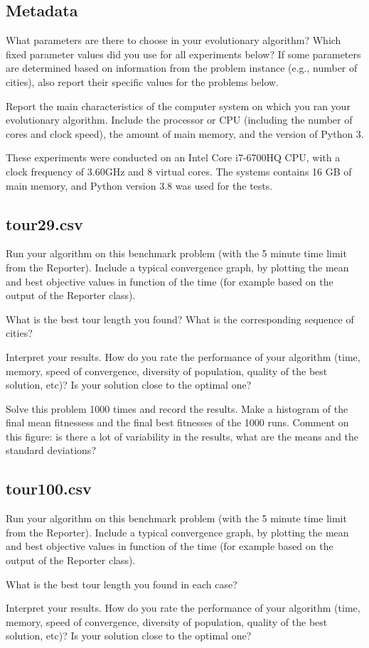 \documentclass[a4paper,10pt]{article}
\newcommand{\ReplaceMe}[1]{{\color{blue}#1}}
\begin{document}
\subsection{Metadata}

\ReplaceMe{What parameters are there to choose in your evolutionary algorithm? Which fixed parameter values did you use for all experiments below? If some parameters are determined based on information from the problem instance (e.g., number of cities), also report their specific values for the problems below.

Report the main characteristics of the computer system on which you ran your evolutionary algorithm. Include the processor or CPU (including the number of cores and clock speed), the amount of main memory, and the version of Python 3.}
These experiments were conducted on an Intel Core i7-6700HQ CPU, with a clock frequency of 3.60GHz and 8 virtual cores. The systems contains 16 GB of main memory, and Python version 3.8 was used for the tests.

\subsection{tour29.csv}

\ReplaceMe{Run your algorithm on this benchmark problem (with the 5 minute time limit from the Reporter). Include a typical convergence graph, by plotting the mean and best objective values in function of the time (for example based on the output of the Reporter class). 

What is the best tour length you found? What is the corresponding sequence of cities? 

Interpret your results. How do you rate the performance of your algorithm (time, memory, speed of convergence, diversity of population, quality of the best solution, etc)? Is your solution close to the optimal one?

Solve this problem 1000 times and record the results. Make a histogram of the final mean fitnessess and the final best fitnesses of the 1000 runs. Comment on this figure: is there a lot of variability in the results, what are the means and the standard deviations?}

\subsection{tour100.csv}

\ReplaceMe{Run your algorithm on this benchmark problem (with the 5 minute time limit from the Reporter). Include a typical convergence graph, by plotting the mean and best objective values in function of the time (for example based on the output of the Reporter class). 

What is the best tour length you found in each case? 

Interpret your results. How do you rate the performance of your algorithm (time, memory, speed of convergence, diversity of population, quality of the best solution, etc)? Is your solution close to the optimal one?}
\end{document}

